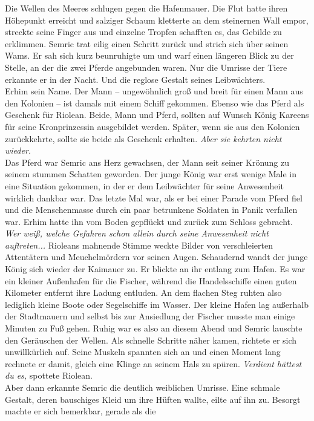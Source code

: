 Die Wellen des Meeres schlugen gegen die Hafenmauer. Die Flut hatte ihren Höhepunkt erreicht und 
salziger Schaum kletterte an dem steinernen Wall empor, streckte seine Finger aus und einzelne 
Tropfen schafften es, das Gebilde zu erklimmen. Semric trat eilig einen Schritt zurück und strich 
sich über seinen Wams. Er sah sich kurz beunruhigte um und warf einen längeren Blick zu der Stelle, 
an der die zwei Pferde angebunden waren. Nur die Umrisse der Tiere erkannte er in der Nacht. Und 
die reglose Gestalt seines Leibwächters. \\
Erhim sein Name. Der Mann – ungewöhnlich groß und breit für einen Mann aus den Kolonien – ist 
damals mit einem Schiff gekommen. Ebenso wie das Pferd als Geschenk für Riolean. Beide, Mann und 
Pferd, sollten auf Wunsch König Kareens für seine Kronprinzessin ausgebildet werden. Später, wenn 
sie aus den Kolonien zurückkehrte, sollte sie beide als Geschenk erhalten. \textit{Aber sie kehrten 
nicht wieder.}\\
Das Pferd war Semric ans Herz gewachsen, der Mann seit seiner Krönung zu seinem stummen Schatten 
geworden. Der junge König war erst wenige Male in eine Situation gekommen, in der er dem 
Leibwächter für seine Anwesenheit wirklich dankbar war. Das letzte Mal war, als er bei einer Parade 
vom Pferd fiel und die Menschenmasse durch ein paar betrunkene Soldaten in Panik verfallen war. 
Erhim hatte ihn vom Boden gepflückt und zurück zum Schloss gebracht. \textit{Wer weiß, welche 
Gefahren schon allein durch seine Anwesenheit nicht auftreten...} Rioleans mahnende Stimme weckte 
Bilder von verschleierten Attentätern und Meuchelmördern vor seinen Augen. Schaudernd wandt der 
junge König sich wieder der Kaimauer zu. Er blickte an ihr entlang zum Hafen. Es war ein kleiner 
Außenhafen für die Fischer, während die Handelsschiffe einen guten Kilometer entfernt ihre Ladung 
entluden. An dem flachen Steg ruhten also lediglich kleine Boote oder Segelschiffe im Wasser. Der 
kleine Hafen lag außerhalb der Stadtmauern und selbst bis zur Ansiedlung der Fischer musste man 
einige Minuten zu Fuß gehen. Ruhig war es also an diesem Abend und Semric lauschte den Geräuschen 
der Wellen. Als schnelle Schritte näher kamen, richtete er sich unwillkürlich auf. Seine Muskeln 
spannten sich an und einen Moment lang rechnete er damit, gleich eine Klinge an seinem Hals zu 
spüren. \textit{Verdient hättest du es,} spottete Riolean.\\
Aber dann erkannte Semric die deutlich weiblichen Umrisse. Eine schmale Gestalt, deren bauschiges 
Kleid um ihre Hüften wallte, eilte auf ihn zu. Besorgt machte er sich bemerkbar, gerade als die 
